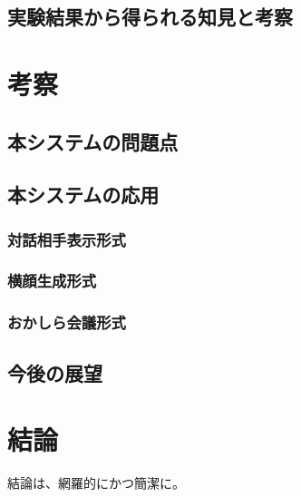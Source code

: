 \documentclass[a4j,11pt,oneside,openany,report,draft]{jsbook}
\begin{document}
\section{実験結果から得られる知見と考察}

\chapter{考察}
\section{本システムの問題点}
\section{本システムの応用}
  \subsection{対話相手表示形式}
  \subsection{横顔生成形式}
  \subsection{おかしら会議形式}
\section{今後の展望}



\chapter{結論}
結論は、網羅的にかつ簡潔に。



\end{document}
